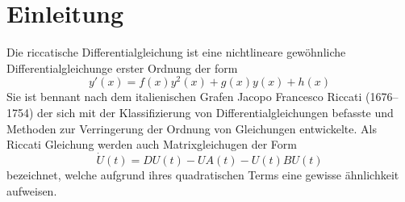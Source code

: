 \section{Einleitung} \label{kra:section:einleitung}
Die riccatische Differentialgleichung ist eine nichtlineare gewöhnliche Differentialgleichunge erster Ordnung der form
\begin{equation}
    \label{kra:riccati}
    y'(x) = f(x)y^2(x) + g(x)y(x) + h(x)
\end{equation}
Sie ist bennant nach dem italienischen Grafen Jacopo Francesco Riccati (1676–1754) der sich mit der Klassifizierung von Differentialgleichungen befasste und Methoden zur Verringerung der Ordnung von Gleichungen entwickelte.
Als Riccati Gleichung werden auch Matrixgleichugen der Form
\begin{equation}
    \label{kra:matrixriccati}
    \dot{U}(t) = DU(t) - UA(t) - U(t)BU(t) %
\end{equation}
bezeichnet, welche aufgrund ihres quadratischen Terms eine gewisse ähnlichkeit aufweisen.